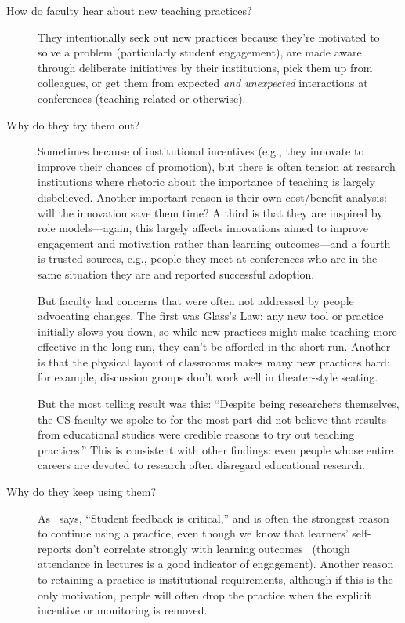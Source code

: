 \begin{description}

\item[How do faculty hear about new teaching practices?]
  They intentionally seek out new practices
  because they're motivated to solve a problem (particularly student engagement),
  are made aware through deliberate initiatives by their institutions,
  pick them up from colleagues,
  or get them from expected \emph{and unexpected} interactions at conferences
  (teaching-related or otherwise).

\item[Why do they try them out?]
  Sometimes because of institutional incentives
  (e.g., they innovate to improve their chances of promotion),
  but there is often tension at research institutions
  where rhetoric about the importance of teaching is largely disbelieved.
  Another important reason is their own cost/benefit analysis:
  will the innovation save them time?
  A third is that they are inspired by role models---again,
  this largely affects innovations aimed to improve engagement and motivation
  rather than learning outcomes---and a fourth is trusted sources,
  e.g.,
  people they meet at conferences who are in the same situation they are
  and reported successful adoption.

  But faculty had concerns that were often not addressed by people advocating changes.
  The first was Glass's Law:
  any new tool or practice initially slows you down,
  so while new practices might make teaching more effective in the long run,
  they can't be afforded in the short run.
  Another is that the physical layout of classrooms makes many new practices hard:
  for example,
  discussion groups don't work well in theater-style seating.

  But the most telling result was this:
  ``Despite being researchers themselves,
  the CS faculty we spoke to for the most part did not believe that
  results from educational studies were credible reasons to try out teaching practices.''
  This is consistent with other findings:
  even people whose entire careers are devoted to research often disregard educational research.

\item[Why do they keep using them?]
  As~\cite{Bark2015} says, ``Student feedback is critical,''
  and is often the strongest reason to continue using a practice,
  even though we know that learners' self-reports don't correlate strongly with learning outcomes~\cite{Star2014,Uttl2017}
  (though attendance in lectures is a good indicator of engagement).
  Another reason to retaining a practice is institutional requirements,
  although if this is the only motivation,
  people will often drop the practice
  when the explicit incentive or monitoring is removed.

\end{description}


